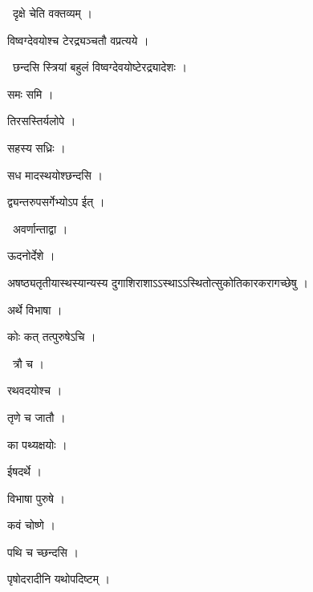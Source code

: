 \documentclass[10pt, openany, oneside]{book}
\begin{document}
\par\noindent\hspace{1.5em}{\vps वा॰}~{\qt दृक्षे चेति वक्तव्यम् ।}

\noindent विष्वग्देवयोश्च टेरद्र्यञ्चतौ वप्रत्यये ।

\par\noindent\hspace{1.5em}{\vps वा॰}~{\qt छन्दसि स्त्रियां बहुलं विष्वग्देवयोष्टेरद्र्यादेशः ।}

\noindent समः समि ।

\noindent तिरसस्तिर्यलोपे ।

\noindent सहस्य सध्रिः ।

\noindent सध मादस्थयोश्छन्दसि ।

\noindent द्व्यन्तरुपसर्गेभ्योऽप ईत् ।

\par\noindent\hspace{1.5em}{\vps वा॰}~{\qt अवर्णान्ताद्वा ।}

\noindent ऊदनोर्देशे ।

\noindent अषष्ठ्यतृतीयास्थस्यान्यस्य दुगाशिराशाऽऽस्थाऽऽस्थितोत्सुकोतिकारकरागच्छेषु ।

\noindent अर्थे विभाषा ।

\noindent कोः कत् तत्पुरुषेऽचि ।

\par\noindent\hspace{1.5em}{\vps वा॰}~{\qt त्रौ च ।}

\noindent रथवदयोश्च ।

\noindent तृणे च जातौ ।

\noindent का पथ्यक्षयोः ।

\noindent ईषदर्थे ।

\noindent विभाषा पुरुषे ।

\noindent कवं चोष्णे ।

\noindent पथि च च्छन्दसि ।

\noindent पृषोदरादीनि यथोपदिष्टम् ।
\end{document}
